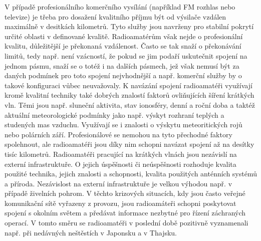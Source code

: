 V případě profesionálního komerčního vysílání (například FM rozhlas nebo
televize) je třeba pro dosažení kvalitního příjmu být od výsilače vzdálen maximálně
v desitkách kilometrů. Tyto služby jsou navrženy pro stabilní pokrytí určité
oblasti v definované kvalitě. Radioamatérům však nejde o profesionální kvalitu,
důležitější je překonaná vzdálenost. Často se tak snaží o překonávání limitů, tedy
např. není vzácností, že pokud se jim podaří uskutečnit spojení na jednom pásmu,
snaží se o totéž i na dalších pásmech, jež však nemusí být za daných
podmínek pro toto spojení nejvhodnější a např. komerční služby by o takové
konfiguraci vůbec neuvažovaly. K navázání spojení radioamatéři využívají kromě
kvalitní techniky také dobrých znalostí faktorů
ovliňujících šíření krátkých vln. Těmi jsou např. sluneční aktivita,
stav ionosféry, denní a roční doba a taktéž aktuální meteorologické podmínky
jako např. výskyt
rozhraní teplých a studených mas vzduchu. Využívají se i znalosti o výskytu
meteoritických rojů nebo polárních září. Profesionálové se nemohou na tyto přechodné faktory spolehnout, ale 
radioamatéři jsou díky nim schopni navázat spojení až na desítky tisíc
kilometrů. Radioamatéři pracující na krátkých vlnách jsou nezávislí na externí
infrastruktuře. O jejich úspěšnosti či neúspěšnosti rozhoduje kvalita použité technika,
jejich znalosti a schopnosti, kvalita použitých anténních systémů a příroda. Nezávislost na externí infrastruktuře je velkou výhodou např. v
případě živelních pohrom. V těchto krizových situacích, kdy jsou často veřejné
komunikační sítě vyřazeny z provozu, jsou radioamáteři schopni poskytovat
spojení s okolním světem a předávat informace nezbytné pro řízení záchraných
operací. V tomto směru se radioamatéři v poslední době pozitivně vyznamenali např. při
nedávných neštěstích v Japonsku a v Thajsku. 

